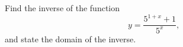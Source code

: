 Find the inverse of the function
\[
y=\dfrac{5^{1+x}+1}{5^x},
\]
and state the domain of the inverse.
